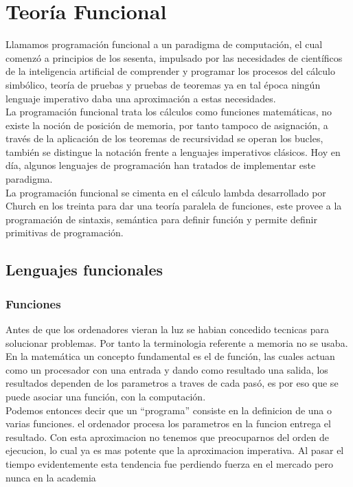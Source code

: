 
\chapter{Teoría Funcional}

Llamamos programación funcional a un paradigma de computación, el cual comenzó a principios de los sesenta, impulsado por las necesidades de científicos de la inteligencia artificial de comprender y programar los procesos del cálculo simbólico, teoría de pruebas y pruebas de teoremas ya en tal época ningún lenguaje imperativo daba una aproximación a estas necesidades.\\
La programación funcional trata los cálculos como funciones matemáticas, no existe la noción de posición de memoria, por tanto tampoco de asignación, a través de la aplicación de los teoremas de recursividad se operan los bucles, también se distingue la notación frente a lenguajes imperativos clásicos. Hoy en día, algunos lenguajes de programación han tratados de implementar este paradigma.\\
La programación funcional se cimenta en el cálculo lambda desarrollado por Church en los treinta para dar una teoría paralela de funciones, este provee a la programación de sintaxis, semántica para definir función y permite definir primitivas de programación.

\section{Lenguajes funcionales}

\subsection{Funciones}

Antes de que los ordenadores vieran la luz se habian concedido tecnicas para solucionar problemas. Por tanto la terminologia referente a memoria no se usaba. En la matemática un concepto fundamental  es el de función, las cuales actuan como un procesador con una entrada y dando como resultado una salida, los resultados dependen de los parametros a traves de cada pasó, es por eso que se puede asociar una función, con la computación.\\

Podemos entonces decir que un ``programa'' consiste en la definicion de una o varias funciones.  el ordenador procesa los parametros en la funcion  entrega el resultado. Con esta aproximacion no tenemos que preocuparnos del orden de ejecucion, lo cual ya es mas potente que la aproximacion imperativa.
Al pasar el tiempo evidentemente esta tendencia fue perdiendo fuerza en el mercado pero nunca en la academia 

